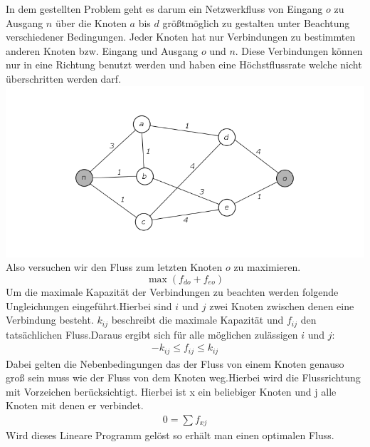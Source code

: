 	In dem gestellten Problem geht es darum ein Netzwerkfluss von Eingang $o$ zu Ausgang $n$ über die Knoten $a$ bis $d$ größtmöglich zu gestalten unter Beachtung verschiedener Bedingungen.  Jeder Knoten hat nur Verbindungen zu bestimmten anderen Knoten bzw. Eingang und Ausgang $o$ und $n$. Diese Verbindungen können nur in eine Richtung benutzt werden und haben eine Höchstflussrate welche nicht überschritten werden darf.
	\includegraphics*[width=\textwidth]{Grafiken/Netzwerkflussbild.png}
	Also versuchen wir den Fluss zum letzten Knoten $o$ zu maximieren.
	\[ \max(f_{do}+f_{eo}) \]
	Um die maximale Kapazität der Verbindungen zu beachten werden folgende Ungleichungen eingeführt.Hierbei sind $i$ und $j$ zwei Knoten zwischen denen eine Verbindung besteht. $k_{ij}$ beschreibt die maximale Kapazität und $f_{ij}$ den tatsächlichen Fluss.Daraus ergibt sich für alle möglichen zulässigen $i$ und $j$:  
	\begin{align*}
		-k_{ij} \leq f_{ij} \leq k_{ij}
	\end{align*}
	Dabei gelten die Nebenbedingungen das der Fluss von einem Knoten genauso groß sein muss wie der Fluss von dem Knoten weg.Hierbei wird die Flussrichtung mit Vorzeichen berücksichtigt. Hierbei ist x ein beliebiger Knoten und j alle Knoten mit denen er verbindet.
	\begin{align*}
	0=\sum{f_{xj}}
	\end{align*}
	Wird dieses Lineare Programm gelöst so erhält man einen optimalen Fluss. 
	
	
	
	